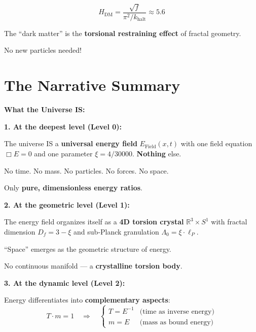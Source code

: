 	\begin{equation}
		H_{\text{DM}} = \frac{\sqrt{f}}{\pi^2/k_{\text{halt}}} \approx 5.6
	\end{equation}
	
	The \enquote{dark matter} is the \textbf{torsional restraining effect} of fractal geometry.
	
	No new particles needed!
	
	\section{The Narrative Summary}
	
	\begin{revolutionary}[The Complete Story]
		
		\textbf{What the Universe IS:}
		\normalsize
		
		\vspace{0.5cm}
		
		\textbf{1. At the deepest level (Level 0):}
		
		The universe IS a \textbf{universal energy field} $E_{\text{Field}}(x,t)$ with one field equation $\Box E = 0$ and one parameter $\xi = 4/30000$. \textbf{Nothing} else.
		
		\vspace{0.3cm}
		
		No time. No mass. No particles. No forces. No space.
		
		Only \textbf{pure, dimensionless energy ratios}.
		
		\vspace{0.5cm}
		
		\textbf{2. At the geometric level (Level 1):}
		
		The energy field organizes itself as a \textbf{4D torsion crystal} $\mathbb{R}^3 \times S^1$ with fractal dimension $D_f = 3-\xi$ and sub‑Planck granulation $\Lambda_0 = \xi \cdot \ell_P$.
		
		\vspace{0.3cm}
		
		\enquote{Space} emerges as the geometric structure of energy.
		
		No continuous manifold — a \textbf{crystalline torsion body}.
		
		\vspace{0.5cm}
		
		\textbf{3. At the dynamic level (Level 2):}
		
		Energy differentiates into \textbf{complementary aspects}:
		\begin{equation}
			T \cdot m = 1 \quad \Rightarrow \quad \begin{cases}
				T = E^{-1} & \text{(time as inverse energy)} \\
				m = E & \text{(mass as bound energy)}
			\end{cases}
		\end{equation}
		

\end{revolutionary}
